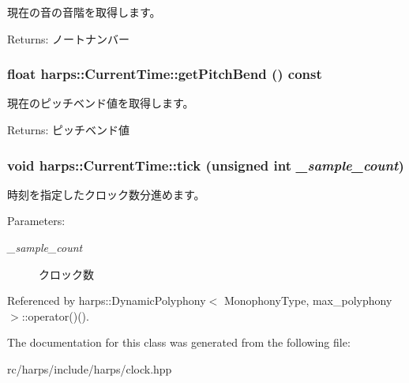 現在の音の音階を取得します。 \begin{Desc}
\item[Returns:]ノートナンバー \end{Desc}
\subsubsection[getPitchBend]{\setlength{\rightskip}{0pt plus 5cm}float harps::CurrentTime::getPitchBend () const\hspace{0.3cm}{\tt  [inline]}}\label{classharps_1_1CurrentTime_4843be872283108748b222eebefec0c2}


現在のピッチベンド値を取得します。 \begin{Desc}
\item[Returns:]ピッチベンド値 \end{Desc}
\subsubsection[tick]{\setlength{\rightskip}{0pt plus 5cm}void harps::CurrentTime::tick (unsigned int {\em \_\-sample\_\-count})\hspace{0.3cm}{\tt  [inline]}}\label{classharps_1_1CurrentTime_4997fde13ba0065725222565dedc6321}


時刻を指定したクロック数分進めます。 \begin{Desc}
\item[Parameters:]
\begin{description}
\item[{\em \_\-sample\_\-count}]クロック数 \end{description}
\end{Desc}


Referenced by harps::DynamicPolyphony$<$ MonophonyType, max\_\-polyphony $>$::operator()().

The documentation for this class was generated from the following file:\begin{CompactItemize}
\item 
rc/harps/include/harps/clock.hpp\end{CompactItemize}
